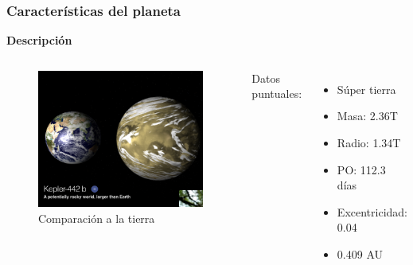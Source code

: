 \documentclass[UKenglish]{beamer}
\begin{document}
\begin{frame}
\frametitle{Características del planeta}{\textbf{Descripción}}

\begin{columns}

\begin{figure}[h!]
    \centering
    \includegraphics[scale=0.2]{Imagenes/7}
    \caption{Comparación a la tierra}
    \label{fig:puntos}
    \end{figure}

    Datos puntuales: 
    \begin{itemize}
        \item Súper tierra
        \item Masa: 2.36T 
        \item Radio: 1.34T
        \item PO: 112.3 días
        \item Excentricidad: 0.04
        \item 0.409 AU 
    \end{itemize}
    \end{columns}

\end{frame}
\end{document}
